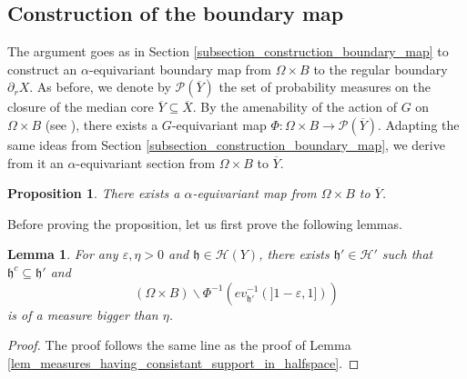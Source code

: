 \documentclass{amsart}
\numberwithin{equation}{section}
\newtheorem{lem}[thm]{Lemma}
\newtheorem{prop}[thm]{Proposition}
\newcommand{\HH}{\mathcal{H}}     %
\newcommand{\hh}{\mathfrak{h}}    %
\newcommand{\PP}{\mathcal{P}}     %
\theoremstyle{definition}
\def\bar{\overline}
\begin{document}
\subsection{Construction of the boundary map}\label{subsection_boundary_map_cocycle}
The argument goes as in Section \ref{subsection_construction_boundary_map} to construct an $\alpha$-equivariant boundary map from $\Omega\times B$ to the regular boundary $\partial_r X$. As before, we denote by $\PP(\bar{Y})$ the set of probability measures on the closure of the median core $\bar{Y}\subseteq \bar X$. By the amenability of the action of $G$ on $\Omega\times B$ (see \cite[Proposition 4.3.4]{Zimmer}), there exists a $G$-equivariant map $\Phi:\Omega\times B\rightarrow \PP(\bar Y)$. Adapting the same ideas from Section \ref{subsection_construction_boundary_map}, we derive from it an $\alpha$-equivariant section from $\Omega\times B$ to $\bar Y$.
\begin{prop}\label{prop_boundary_map_cocycle}
There exists a $\alpha$-equivariant map from $\Omega\times B$ to $\bar Y$.
\end{prop}
Before proving the proposition, let us first prove the following lemmas.
\begin{lem}\label{lem_Fubini1}
    For any $\varepsilon,\eta>0$ and $\hh\in\HH(Y)$, there exists $\hh'\in\HH'$ such that $\hh^c\subseteq \hh'$ and
    \[
    (\Omega\times B)\backslash \Phi^{-1}(ev_{\hh'}^{-1}(]1-\varepsilon,1]))
    \]
    is of a measure bigger than $\eta$.
\end{lem}
\begin{proof}
    The proof follows the same line as the proof of Lemma \ref{lem_measures_having_consistant_support_in_halfspace}.
\end{proof}
\end{document}

